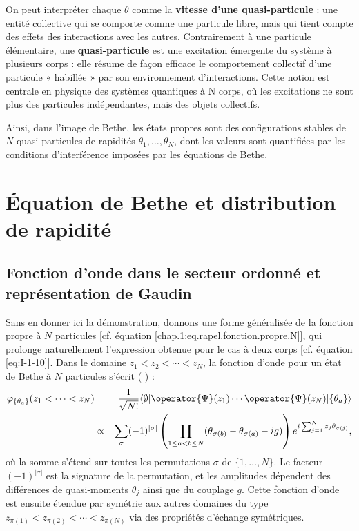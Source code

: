 On peut interpréter chaque $\theta$ comme la {\bf vitesse d’une quasi-particule} : une entité collective qui se comporte comme une particule libre, mais qui tient compte des effets des interactions avec les autres. Contrairement à une particule élémentaire, une {\bf quasi-particule} est une excitation émergente du système à plusieurs corps : elle résume de façon efficace le comportement collectif d’une particule « habillée » par son environnement d’interactions. Cette notion est centrale en physique des systèmes quantiques à N corps, où les excitations ne sont plus des particules indépendantes, mais des objets collectifs.

Ainsi, dans l’image de Bethe, les états propres sont des configurations stables de $N$ quasi-particules de rapidités $\theta_1,\dots,\theta_N$, dont les valeurs sont quantifiées par les conditions d’interférence imposées par les équations de Bethe.



\section{Équation de Bethe et distribution de rapidité}

\subsection{Fonction d’onde dans le secteur ordonné et représentation de Gaudin}

Sans en donner ici la démonstration, donnons une forme généralisée de la fonction propre à $N$ particules [cf. équation \eqref{chap.1:eq.rapel.fonction.propre.N}], qui prolonge naturellement l’expression obtenue pour le cas à deux corps [cf. équation \eqref{eq:I-1-10}].
Dans le domaine $z_1 < z_2 < \cdots < z_N$, la fonction d’onde pour un état de Bethe à $N$ particules s’écrit ({\color{blue} \cite{Korepin_1997,Gaudin_2014,LL_1963_1,Franchini_2016,Wouters2015}}) :
\begin{eqnarray}
	\varphi_{\{\theta_a\}} ( z_1 < \cdots < z_N ) & = &  \frac{1}{\sqrt{N!}}\langle \emptyset \vert \operator{\Psi} ( z_1 ) \cdots \operator{\Psi} (z_N ) \vert \{ \theta_a \} \rangle \notag\\
	& \propto & \sum_\sigma (-1)^{|\sigma|} \left( \prod_{1 \leq a < b \leq N} (\theta_{\sigma(b)} - \theta_{\sigma(a)} - i g) \right) e^{i \sum_{j=1}^{N} z_j \theta_{\sigma(j)}},\label{eq:I-2-17}
\end{eqnarray}
où la somme s'étend sur toutes les permutations $\sigma$ de $\{1,\dots,N\}$. Le facteur $(-1)^{|\sigma|}$ est la signature de la permutation, et les amplitudes dépendent des différences de quasi-moments $\theta_j$ ainsi que du couplage $g$.
Cette fonction d’onde est ensuite étendue par symétrie aux autres domaines du type $z_{\pi(1)} < z_{\pi(2)} < \cdots < z_{\pi(N)}$ via des propriétés d’échange symétriques.

